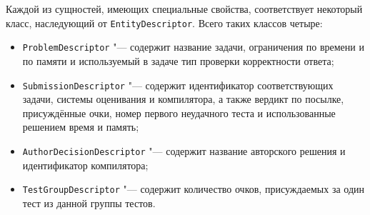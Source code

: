Каждой из сущностей, имеющих специальные свойства, соответствует некоторый класс, наследующий от \texttt{Entity\-Descriptor}. Всего таких классов четыре:

\begin{itemize}
\item \texttt{Problem\-Descriptor} "--- содержит название задачи, ограничения по времени и по памяти и используемый в задаче тип проверки корректности ответа;
\item \texttt{Submission\-Descriptor} "--- содержит идентификатор соответствующих задачи, системы оценивания и компилятора, а также вердикт по посылке, присуждённые очки, номер первого неудачного теста и использованные решением время и память;
\item \texttt{Author\-Decision\-Descriptor} "--- содержит название авторского решения и идентификатор компилятора;
\item \texttt{Test\-Group\-Descriptor} "--- содержит количество очков, присуждаемых за один тест из данной группы тестов.
\end{itemize}